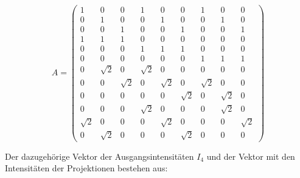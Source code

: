  \begin{equation*}
   A = \begin{pmatrix}
              1 & 0 & 0 & 1 & 0 & 0 & 1 & 0 & 0 \\
              0 & 1 & 0 & 0 & 1 & 0 & 0 & 1 & 0 \\
              0 & 0 & 1 & 0 & 0 & 1 & 0 & 0 & 1 \\
              1 & 1 & 1 & 0 & 0 & 0 & 0 & 0 & 0 \\
              0 & 0 & 0 & 1 & 1 & 1 & 0 & 0 & 0 \\
              0 & 0 & 0 & 0 & 0 & 0 & 1 & 1 & 1 \\
              0 & \sqrt{2} & 0 & \sqrt{2} & 0 & 0 & 0 & 0 & 0 \\
              0 & 0 & \sqrt{2} & 0 & \sqrt{2} & 0 & \sqrt{2} & 0 & 0 \\
              0 & 0 & 0 & 0 & 0 & \sqrt{2} & 0 & \sqrt{2} & 0 \\
              0 & 0 & 0 & \sqrt{2} & 0 & 0 & 0 & \sqrt{2} & 0 \\
              \sqrt{2} & 0 & 0 & 0 & \sqrt{2} & 0 & 0 & 0 & \sqrt{2} \\
              0 & \sqrt{2} & 0 & 0 & 0 & \sqrt{2} & 0 & 0 & 0
      \end{pmatrix}
 \end{equation*}

Der dazugehörige Vektor der Ausgangsintensitäten $I_4$ und der Vektor mit den Intensitäten der
Projektionen bestehen aus:

